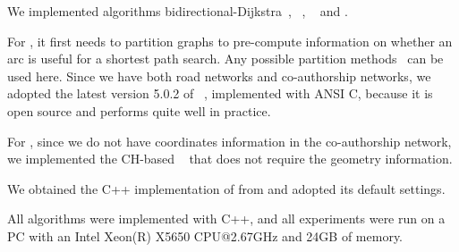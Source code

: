 
 We implemented algorithms bidirectional-Dijkstra~\cite{LubyR89}, \arcflag~\cite{MohringSSWW05}, \tnr~\cite{arz2013transit} and \ah \cite{zhu2013shortest}.

For \arcflag, it first needs to partition graphs to pre-compute information on whether an arc is useful for a shortest path search. Any possible partition methods~\cite{kl70,Karypis98,YangYZK12, delling2011graph} can be used here. Since we have both road networks and co-authorship networks, we adopted the latest version 5.0.2 of \metis~\cite{metis}, implemented with ANSI C, because it is open source and performs quite well in practice.

For \tnr, since we do not have coordinates information in the co-authorship network, we implemented the CH-based \tnr~\cite{arz2013transit} that does not require the geometry information.

We obtained the C++ implementation of \ah from \cite{zhu2013shortest} and adopted its default settings.



 All algorithms were implemented with C++, and
all experiments were run on a PC with an Intel Xeon(R) X5650 CPU@2.67GHz
and 24GB of memory.






